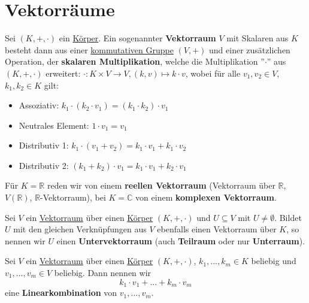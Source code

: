 \documentclass[../../main.tex]{subfiles}
\begin{document}
	
	\chapter{Vektorräume}
	
	\begin{definition}
		\label{def:Vektorraum}
		\label{def:skalareMultiplikation}
		Sei $(K, +, \cdot)$ ein \hyperref[def:Körper]{Körper}. Ein sogenannter \textbf{Vektorraum} $V$ mit Skalaren aus $K$ besteht dann aus einer \hyperref[def:kommutativeGruppe]{kommutativen Gruppe} $(V, +)$ und einer zusätzlichen Operation, der \textbf{skalaren Multiplikation}, welche die Multiplikation ''$\cdot$'' aus $(K,+,\cdot)$ erweitert: $\cdot: K \times V \rightarrow V, (k, v) \mapsto k \cdot v$, wobei für alle $v_1,v_2 \in V$, $k_1,k_2 \in K$ gilt:
		\begin{itemize}
			\item Assoziativ: $k_1 \cdot (k_2 \cdot v_1) = (k_1 \cdot k_2) \cdot v_1$
			\item Neutrales Element: $1 \cdot v_1 = v_1$
			\item Distributiv 1: $k_1 \cdot (v_1 + v_2) = k_1 \cdot v_1 + k_1 \cdot v_2$
			\item Distributiv 2: $(k_1 + k_2) \cdot v_1 = k_1 \cdot v_1 + k_2 \cdot v_1$
		\end{itemize}
		Für $K=\mathbb{R}$ reden wir von einem \textbf{reellen Vektorraum} (Vektorraum über $\mathbb{R}$, $V(\mathbb{R})$, $\mathbb{R}$-Vektorraum), bei $K=\mathbb{C}$ von einem \textbf{komplexen Vektorraum}. 
	\end{definition}

	\begin{definition}
		\label{def:Teilraum}
		\label{def:Untervektorraum}
		\label{def:Unterraum}
		Sei $V$ ein \hyperref[def:Vektorraum]{Vektorraum} über einen \hyperref[def:Körper]{Körper} $(K,+,\cdot)$ und $U \subseteq V$ mit $U\not=\emptyset$. Bildet $U$ mit den gleichen Verknüpfungen aus $V$ ebenfalls einen Vektorraum über $K$, so nennen wir $U$ einen \textbf{Untervektorraum} (auch \textbf{Teilraum} oder nur \textbf{Unterraum}). 
	\end{definition}

	\begin{definition}[Linearkombination]
		\label{def:Linearkombination}
		Sei $V$ ein \hyperref[def:Vektorraum]{Vektorraum} über einen \hyperref[def:Körper]{Körper} $(K,+,\cdot)$, $k_1,...,k_m \in K$ beliebig und $v_1,...,v_m\in V$ beliebig. Dann nennen wir $$k_1 \cdot v_1 + ... + k_m \cdot v_m$$ eine \textbf{Linearkombination} von $v_1,...,v_m$. 
	\end{definition}
\end{document}
